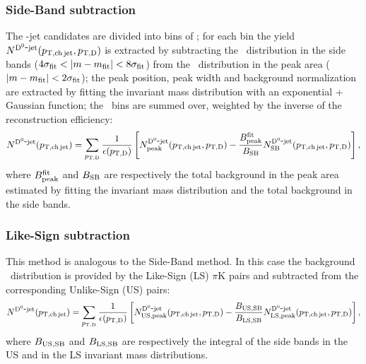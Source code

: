 \documentclass[a4paper]{jpconf}
\begin{document}
\subsubsection*{Side-Band subtraction}
The \Dzero-jet candidates are divided into bins of \ptd; for each bin the yield $N^{\rm \mathrm{D^{0}}\hbox{-}jet}(p_{\mathrm{T,ch\, jet}},p_{\mathrm{T,D}})$ is extracted by subtracting the
\ptchjet\ distribution in the side bands ($4\sigma_{\rm fit} < \lvert m - m_{\rm fit} \rvert < 8\sigma_{\rm fit}$) 
from the \ptchjet\ distribution in the peak area ($\lvert m - m_{\rm fit} \rvert < 2\sigma_{\rm fit}$); the peak position, peak width and background normalization are extracted 
by fitting the invariant mass distribution with an exponential + Gaussian function; the \ptd\ bins are summed over, weighted by the inverse of the reconstruction efficiency:
\begin{equation*}
N^{\rm \mathrm{D^{0}}\hbox{-}jet}(p_{\mathrm{T,ch\, jet}})=\sum_{p_{\mathrm{T,D}}} \frac{1}{\epsilon(p_{\mathrm{T,D}})} 
\left[N_{\rm peak}^{\rm \mathrm{D^{0}}\hbox{-}jet}(p_{\mathrm{T,ch\, jet}},p_{\mathrm{T,D}}) - 
\frac{B_{\rm peak}^{\rm fit}}{B_{\rm SB}} 
N_{\rm SB}^{\rm \mathrm{D^{0}}\hbox{-}jet}(p_{\mathrm{T,ch\, jet}},p_{\mathrm{T,D}})\right],
\end{equation*}
where $B_{\rm peak}^{\rm fit}$ and $B_{\rm SB}$ are respectively the total background
in the peak area estimated by fitting the invariant mass distribution and the total
background in the side bands.
\subsubsection*{Like-Sign subtraction}
This method is analogous to the Side-Band method. In this case the background \ptchjet\ distribution is provided by the Like-Sign (LS) $\pi$K pairs and
subtracted from the corresponding Unlike-Sign (US) pairs:
\begin{equation*}
N^{\rm \mathrm{D^{0}}\hbox{-}jet}(p_{\mathrm{T,ch\, jet}})=\sum_{p_{\mathrm{T,D}}} \frac{1}{\epsilon(p_{\mathrm{T,D}})} 
\left[N_{\rm US, peak}^{\rm \mathrm{D^{0}}\hbox{-}jet}(p_{\mathrm{T,ch\, jet}},p_{\mathrm{T,D}}) - 
\frac{B_{\rm US, SB}}{B_{\rm LS, SB}} 
N_{\rm LS, peak}^{\rm \mathrm{D^{0}}\hbox{-}jet}(p_{\mathrm{T,ch\, jet}},p_{\mathrm{T,D}})\right],
\end{equation*}
where $B_{\rm US, SB}$ and $B_{\rm LS, SB}$ are respectively the integral of
the side bands in the US and in the LS invariant mass distributions.
\end{document}
